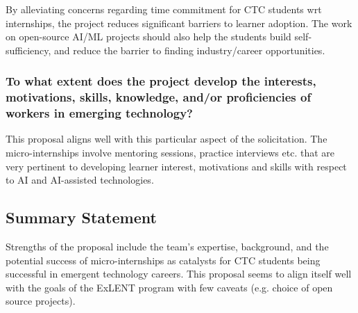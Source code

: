 By alleviating concerns regarding time commitment for CTC students wrt internships, the project reduces significant barriers to learner adoption. The work on open-source AI/ML projects should also help the students build self-sufficiency, and reduce the barrier to finding industry/career opportunities. 

\subsubsection{To what extent does the project develop the interests, motivations, skills, knowledge, and/or proficiencies of workers in emerging technology?}

This proposal aligns well with this particular aspect of the solicitation. The micro-internships involve mentoring sessions, practice interviews etc. that are very pertinent to developing learner interest, motivations and skills with respect to AI and AI-assisted technologies. 

\subsection{Summary Statement} 

Strengths of the proposal include the team's expertise, background, and the potential success of micro-internships as catalysts for CTC students being successful in emergent technology careers. This proposal seems to align itself well with the goals of the ExLENT program with few caveats (e.g. choice of open source projects).

